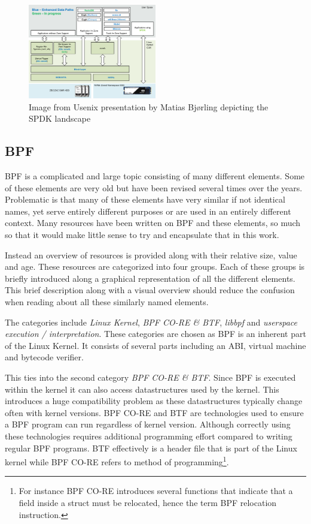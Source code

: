 \documentclass[conference]{IEEEtran}
\begin{document}
\begin{center}
	\begin{figure}[H]
		\includegraphics[width=0.5\textwidth]{resources/images/spdk-zns-ssd-landscape.png}
		\captionsetup{justification=centering}
		\caption{Image from Usenix presentation by Matias Bj{\o}rling
			depicting the SPDK landscape\cite{246542}}
		\label{fig:spdk-landscape}
	\end{figure}
\end{center}

\subsection{BPF}

BPF is a complicated and large topic consisting of many different elements. Some
of these elements are very old but have been revised several times over the
years. Problematic is that many of these elements have very similar if not
identical names, yet serve entirely different purposes or are used in an
entirely different context. Many resources have been written on BPF and these
elements, so much so that it would make little sense to try and encapsulate that
in this work.

Instead an overview of resources is provided along with their relative size,
value and age. These resources are categorized into four groups. Each of these
groups is briefly introduced along a graphical representation of all the
different elements. This brief description along with a visual overview should
reduce the confusion when reading about all these similarly named elements.

The categories include \textit{Linux Kernel}, \textit{BPF CO-RE \& BTF},
\textit{libbpf} and \textit{userspace execution / interpretation}. These
categories are chosen as BPF is an inherent part of the Linux Kernel. It
consists of several parts including an ABI, virtual machine and bytecode
verifier.

This ties into the second category \textit{BPF CO-RE \& BTF}. Since BPF is
executed within the kernel it can also access datastructures used by the kernel.
This introduces a huge compatibility problem as these datastructures typically
change often with kernel versions. BPF CO-RE and BTF are technologies used to
ensure a BPF program can run regardless of kernel version. Although correctly
using these technologies requires additional programming effort compared to
writing regular BPF programs. BTF effectively is a header file that is part of
the Linux kernel while BPF CO-RE refers to method of programming\footnote{For
instance BPF CO-RE introduces several functions that indicate that a field
inside a struct must be relocated, hence the term BPF relocation instruction.}.
\end{document}
